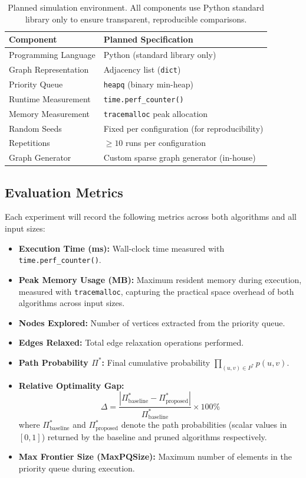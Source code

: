 \begin{table}[h!]
\centering
\renewcommand{\arraystretch}{1.3}
\begin{tabular}{@{}ll@{}}
\toprule
\textbf{Component} & \textbf{Planned Specification} \\
\midrule
Programming Language & Python (standard library only) \\
Graph Representation & Adjacency list (\texttt{dict}) \\
Priority Queue & \texttt{heapq} (binary min-heap) \\
Runtime Measurement & \texttt{time.perf\_counter()} \\
Memory Measurement & \texttt{tracemalloc} peak allocation \\
Random Seeds & Fixed per configuration (for reproducibility) \\
Repetitions & $\geq 10$ runs per configuration \\
Graph Generator & Custom sparse graph generator (in-house) \\
\bottomrule
\end{tabular}
\caption[Planned simulation environment]{Planned simulation environment. All components use Python standard library only to ensure transparent, reproducible comparisons.}
\label{table:simenv}
\end{table}

\subsection{Evaluation Metrics}

Each experiment will record the following metrics across both algorithms and all input sizes:
\begin{itemize}
    \item \textbf{Execution Time (ms):} Wall-clock time measured with \texttt{time.perf\_counter()}.
    \item \textbf{Peak Memory Usage (MB):} Maximum resident memory during execution, measured with \texttt{tracemalloc}, capturing the practical space overhead of both algorithms across input sizes.
    \item \textbf{Nodes Explored:} Number of vertices extracted from the priority queue.
    \item \textbf{Edges Relaxed:} Total edge relaxation operations performed.
    \item \textbf{Path Probability $\Pi^*$:} Final cumulative probability $\prod_{(u,v)\in P^*} p(u,v)$.
    \item \textbf{Relative Optimality Gap:}
    \[
    \Delta = \frac{|\Pi^*_{\text{baseline}} - \Pi^*_{\text{proposed}}|}{\Pi^*_{\text{baseline}}} \times 100\%
    \]
    where $\Pi^*_{\text{baseline}}$ and $\Pi^*_{\text{proposed}}$ denote the path probabilities (scalar values in $[0,1]$) returned by the baseline and pruned algorithms respectively.
    \item \textbf{Max Frontier Size (MaxPQSize):} Maximum number of elements in the priority queue during execution.
\end{itemize}

